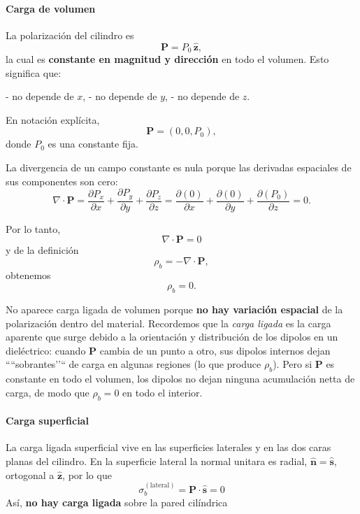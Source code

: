 \documentclass{article}
\begin{document}
\paragraph{Carga de volumen}

La polarización del cilindro es
\[
\mathbf{P} = P_{0}\,\hat{\mathbf{z}},
\]
la cual es \textbf{constante en magnitud y dirección} en todo el volumen.  
Esto significa que:

- no depende de $x$,  
- no depende de $y$,  
- no depende de $z$.  

En notación explícita,
\[
\mathbf{P} = (0, 0, P_{0}),
\]
donde $P_{0}$ es una constante fija.

La divergencia de un campo constante es nula porque las derivadas espaciales de sus componentes son cero:
\[
\nabla\cdot\mathbf{P}
= \frac{\partial P_{x}}{\partial x}
+ \frac{\partial P_{y}}{\partial y}
+ \frac{\partial P_{z}}{\partial z}
= \frac{\partial (0)}{\partial x}
+ \frac{\partial (0)}{\partial y}
+ \frac{\partial (P_{0})}{\partial z}
= 0.
\]

Por lo tanto,
\begin{equation}
\nabla\cdot\mathbf{P} = 0
\label{eq:div-P-cilindro}
\end{equation}
y de la definición
\[
\rho_{b} = -\nabla\cdot\mathbf{P},
\]
obtenemos
\begin{equation}
\rho_{b} = 0.
\label{eq:rho-b-cilindro-final}
\end{equation}

No aparece carga ligada de volumen porque \textbf{no hay variación espacial} de la
polarización dentro del material. Recordemos que la \emph{carga ligada} es la carga
aparente que surge debido a la orientación y distribución de los dipolos en un
dieléctrico: cuando $\mathbf{P}$ cambia de un punto a otro, sus dipolos internos dejan
``“sobrantes’’`` de carga en algunas regiones (lo que produce $\rho_{b}$). Pero si
$\mathbf{P}$ es constante en todo el volumen, los dipolos no dejan ninguna acumulación
netta de carga, de modo que $\rho_{b}=0$ en todo el interior.



\paragraph{Carga superficial}

La carga ligada superficial vive en las superficies laterales y en las dos caras planas del cilindro.  
En la superficie lateral la normal unitara es radial, $\hat{\mathbf{n}} = \hat{\mathbf{s}}$, ortogonal a $\hat{\mathbf{z}}$, por lo que
\begin{equation}
\sigma_{b}^{(\text{lateral})} = \mathbf{P}\cdot\hat{\mathbf{s}} = 0
\label{eq:sigma-b-lateral}
\end{equation}
Así, \textbf{no hay carga ligada} sobre la pared cilíndrica
\end{document}
